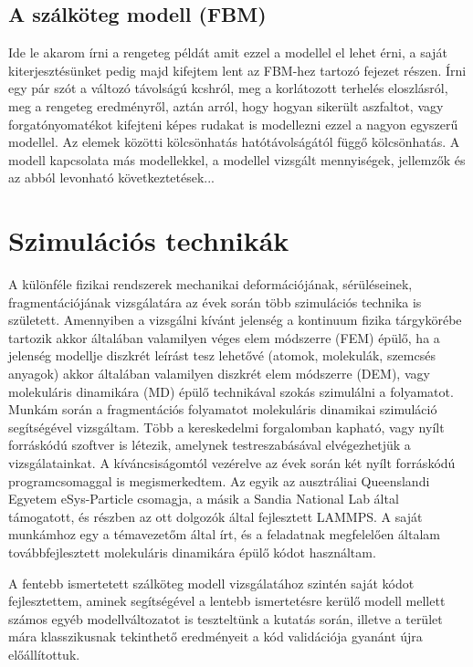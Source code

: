 \subsection{A szálköteg modell (FBM)}
Ide le akarom írni a rengeteg példát amit ezzel a modellel el lehet érni, a saját kiterjesztésünket pedig majd kifejtem lent az FBM-hez tartozó fejezet részen.
Írni egy pár szót a változó távolságú kcshról, meg a korlátozott terhelés eloszlásról, meg a rengeteg eredményről, aztán arról, hogy hogyan sikerült aszfaltot, vagy forgatónyomatékot kifejteni képes rudakat is modellezni ezzel a nagyon egyszerű modellel. 
Az elemek közötti kölcsönhatás hatótávolságától függő kölcsönhatás. 
A modell kapcsolata más modellekkel, a modellel vizsgált mennyiségek, jellemzők és az abból levonható következtetések...

\section{Szimulációs technikák}
A különféle fizikai rendszerek mechanikai deformációjának, sérüléseinek, fragmentációjának vizsgálatára az évek során több szimulációs technika is született. Amennyiben a vizsgálni kívánt jelenség a kontinuum fizika tárgykörébe tartozik akkor általában valamilyen véges elem módszerre (FEM)\cite{comphys_woolfsonpert1999} épülő, ha a jelenség modellje diszkrét leírást tesz lehetővé (atomok, molekulák, szemcsés anyagok) akkor általában valamilyen diszkrét elem módszerre (DEM), vagy molekuláris dinamikára (MD) épülő technikával szokás szimulálni a folyamatot. Munkám során a fragmentációs folyamatot molekuláris dinamikai szimuláció segítségével vizsgáltam. Több a kereskedelmi forgalomban kapható, vagy nyílt forráskódú szoftver is létezik, amelynek testreszabásával elvégezhetjük a vizsgálatainkat. A kíváncsiságomtól vezérelve az évek során két nyílt forráskódú programcsomaggal is megismerkedtem. Az egyik az ausztráliai Queenslandi Egyetem eSys-Particle csomagja, a másik a Sandia National Lab által támogatott, és részben az ott dolgozók által fejlesztett LAMMPS. A saját munkámhoz egy a témavezetőm által írt, és a feladatnak megfelelően általam továbbfejlesztett molekuláris dinamikára épülő kódot használtam. 

A fentebb ismertetett szálköteg modell vizsgálatához szintén saját kódot fejlesztettem, aminek segítségével a lentebb ismertetésre kerülő modell mellett számos egyéb modellváltozatot is teszteltünk a kutatás során, illetve a terület mára klasszikusnak tekinthető eredményeit a kód validációja gyanánt újra előállítottuk. 


